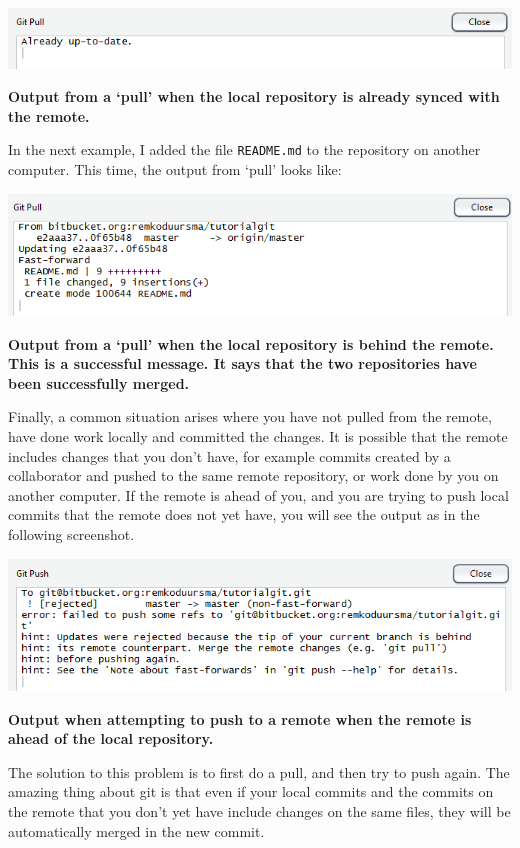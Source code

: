 \documentclass[]{book}
\begin{document}
\includegraphics[width=0.75\linewidth]{screenshots/session2pullalreadyuptodate}

\textbf{Output from a `pull' when the local repository is already synced with the remote.}

In the next example, I added the file \texttt{README.md} to the repository on another computer. This time, the output from `pull' looks like:

\includegraphics[width=0.75\linewidth]{screenshots/session2pull}

\textbf{Output from a `pull' when the local repository is behind the remote. This is a successful message. It says that the two repositories have been successfully merged.}

Finally, a common situation arises where you have not pulled from the remote, have done work locally and committed the changes. It is possible that the remote includes changes that you don't have, for example commits created by a collaborator and pushed to the same remote repository, or work done by you on another computer. If the remote is ahead of you, and you are trying to push local commits that the remote does not yet have, you will see the output as in the following screenshot.

\includegraphics[width=0.75\linewidth]{screenshots/session2pushbehind}

\textbf{Output when attempting to push to a remote when the remote is ahead of the local repository.}

The solution to this problem is to first do a pull, and then try to push again. The amazing thing about git is that even if your local commits and the commits on the remote that you don't yet have include changes on the same files, they will be automatically merged in the new commit.
\end{document}
